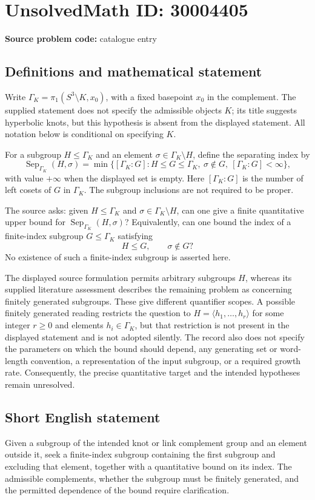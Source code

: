 \documentclass[11pt]{article}
\begin{document}
\section*{UnsolvedMath ID: 30004405}
\textbf{Source problem code:} catalogue entry
\subsection{Definitions and mathematical statement}
Write \(\Gamma_K=\pi_1(S^3\setminus K,x_0)\), with a fixed basepoint \(x_0\) in the complement. The supplied statement does not specify the admissible objects \(K\); its title suggests hyperbolic knots, but this hypothesis is absent from the displayed statement. All notation below is conditional on specifying \(K\).

For a subgroup \(H\leq\Gamma_K\) and an element \(\sigma\in\Gamma_K\setminus H\), define the separating index by
\[
\operatorname{Sep}_{\Gamma_K}(H,\sigma)
=
\min\bigl\{[\Gamma_K:G]: H\leq G\leq\Gamma_K,\ \sigma\notin G,\ [\Gamma_K:G]<\infty\bigr\},
\]
with value \(+\infty\) when the displayed set is empty. Here \([\Gamma_K:G]\) is the number of left cosets of \(G\) in \(\Gamma_K\). The subgroup inclusions are not required to be proper.

The source asks: given \(H\leq\Gamma_K\) and \(\sigma\in\Gamma_K\setminus H\), can one give a finite quantitative upper bound for \(\operatorname{Sep}_{\Gamma_K}(H,\sigma)\)? Equivalently, can one bound the index of a finite-index subgroup \(G\leq\Gamma_K\) satisfying
\[
H\leq G,\qquad \sigma\notin G?
\]
No existence of such a finite-index subgroup is asserted here.

The displayed source formulation permits arbitrary subgroups \(H\), whereas its supplied literature assessment describes the remaining problem as concerning finitely generated subgroups. These give different quantifier scopes. A possible finitely generated reading restricts the question to \(H=\langle h_1,\ldots,h_r\rangle\) for some integer \(r\geq0\) and elements \(h_i\in\Gamma_K\), but that restriction is not present in the displayed statement and is not adopted silently. The record also does not specify the parameters on which the bound should depend, any generating set or word-length convention, a representation of the input subgroup, or a required growth rate. Consequently, the precise quantitative target and the intended hypotheses remain unresolved.
\subsection{Short English statement}
Given a subgroup of the intended knot or link complement group and an element outside it, seek a finite-index subgroup containing the first subgroup and excluding that element, together with a quantitative bound on its index. The admissible complements, whether the subgroup must be finitely generated, and the permitted dependence of the bound require clarification.
\end{document}
